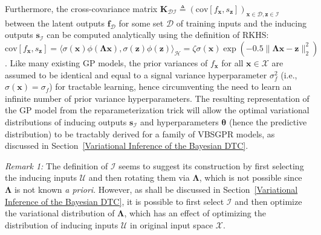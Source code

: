 \documentclass[conference]{IEEEtran}
\begin{document}
%
%
Furthermore, the cross-covariance matrix $\mathbf{K}_{\mathcal{D}\mathcal{I}} \triangleq (\text{cov}[f_{\mathbf{x}}, s_{\mathbf{z}}])_{\mathbf{x} \in \mathcal{D},\mathbf{z} \in \mathcal{I}}$ between the latent outputs $\mathbf{f}_\mathcal{D}$ for some set $\mathcal{D}$ of training inputs and the inducing outputs $\mathbf{s}_\mathcal{I}$ can be computed analytically using 
the definition of RKHS: $\text{cov}[f_{\mathbf{x}}, s_{\mathbf{z}}] = \langle \sigma(\mathbf{x})\phi(\mathbf{\Lambda}\mathbf{x}), \sigma(\mathbf{z})\phi(\mathbf{z})\rangle_{\mathcal{H}} = \zeta\sigma(\mathbf{x})\exp(-0.5\|\mathbf{\Lambda}\mathbf{x}-\mathbf{z}\|^2_2)$. 
Like many existing GP models, the prior variances of 
$f_\mathbf{x}$ for all $\mathbf{x}\in\mathcal{X}$
are assumed to be identical and equal to a signal variance hyperparameter $\sigma_f^2$ (i.e., $\sigma(\mathbf{x}) = \sigma_f$) for tractable learning, hence circumventing the need to learn 
an infinite number of prior variance hyperparameters.
The resulting representation of the GP model from the reparameterization trick will allow the optimal variational distributions of inducing outputs $\mathbf{s}_\mathcal{I}$ and hyperparameters $\boldsymbol{\theta}$ (hence the predictive distribution) to be tractably derived for a family of VBSGPR models, as discussed in Section~\ref{Variational Inference of the Bayesian DTC}.\vspace{1mm}

\emph{Remark 1:} The definition of $\mathcal{I}$ seems to suggest its construction by first selecting the inducing inputs $\mathcal{U}$ and then rotating them via $\mathbf{\Lambda}$, which is not possible since $\mathbf{\Lambda}$ is not known \emph{a priori}.
However, as shall be discussed in Section~\ref{Variational Inference of the Bayesian DTC},
it is possible to first select $\mathcal{I}$ and then optimize the variational distribution of $\mathbf{\Lambda}$, which has an effect of optimizing the distribution of inducing inputs $\mathcal{U}$ in original input space $\mathcal{X}$.\vspace{1mm}
\end{document}
